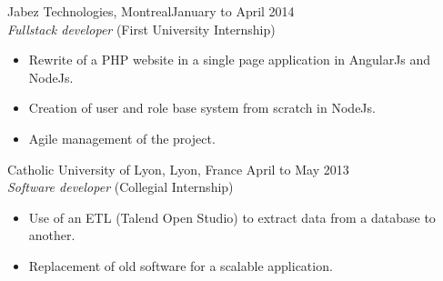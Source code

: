 \documentclass{res}
\newcommand{\inFrench}[1]{}
\newcommand{\inEnglish}[1]{#1}
\begin{document}
\begin{resume}
{	%
	Jabez Technologies, Montreal\footnotemark[\value{footnote}]
	\hfill January to April 2014 \\
	{\sl Fullstack developer} \hfill (First University Internship)
	\vspace{0.05in}

	\begin{itemize} \itemsep -2pt
		\item Rewrite of a PHP website in a single page application in AngularJs and NodeJs.
		\item Creation of user and role base system from scratch in NodeJs.
		\item Agile management of the project.
	\end{itemize}

	Catholic University of Lyon, Lyon, France
	\hfill April to May 2013 \\
	{\sl Software developer} \hfill (Collegial Internship)
	\vspace{0.05in}

	\begin{itemize} \itemsep -2pt
		\item Use of an ETL (Talend Open Studio) to extract data from a database to another.
		\item Replacement of old software for a scalable application.
	\end{itemize}



}

\newpage

\inFrench{
	\section{Connaissances informatiques}
}
\inEnglish{
}
\end{resume}
\end{document}
